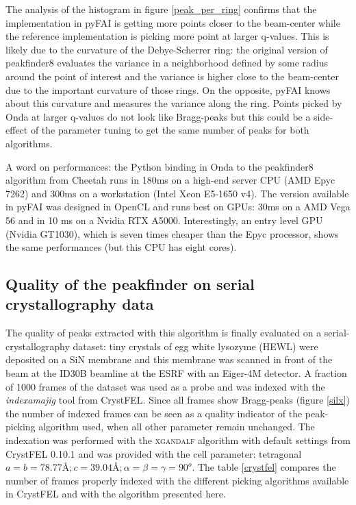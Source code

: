 \documentclass[preprint]{iucr}              %
\begin{document}
The analysis of the histogram in figure \ref{peak_per_ring} confirms that the implementation in pyFAI is getting more points closer to the beam-center while the reference implementation is picking more point at larger q-values.
This is likely due to the curvature of the Debye-Scherrer ring: the original version of peakfinder8 evaluates the variance in a neighborhood defined by some radius around the point of interest and the variance is higher close to the beam-center due to the important curvature of those rings.
On the opposite, pyFAI knows about this curvature and measures the variance along the ring.
Points picked by Onda at larger q-values do not look like Bragg-peaks but this could be a side-effect of the parameter tuning to get the same number of peaks for both algorithms.

A word on performances: the Python binding in Onda to the peakfinder8 algorithm from Cheetah runs in 180ms on a high-end server CPU (AMD Epyc 7262) and 300ms on a workstation (Intel Xeon E5-1650 v4). 
The version available in pyFAI was designed in OpenCL \cite{opencl_khronos, opencl, pyopencl} and runs best on GPUs: 30ms on a AMD Vega 56 and in 10 ms on a Nvidia RTX A5000. 
Interestingly, an entry level GPU (Nvidia GT1030), which is seven times cheaper than the Epyc processor, shows the same performances (but this CPU has eight cores). %

\subsection{Quality of the peakfinder on serial crystallography data}

The quality of peaks extracted with this algorithm is finally evaluated on a serial-crystallography dataset: tiny crystals of egg white lysozyme (HEWL) were deposited on a SiN membrane and this membrane was scanned in front of the beam at the ID30B beamline at the ESRF with an Eiger-4M detector.%
A fraction of 1000 frames of the dataset \cite{ssx-Lyso} was used as a probe and was indexed with the \textit{indexamajig} tool from CrystFEL. 
Since all frames show Bragg-peaks (figure \ref{silx}) the number of indexed frames can be seen as a quality indicator of the peak-picking algorithm used, when all other parameter remain unchanged.
The indexation was performed with the \textsc{xgandalf} algorithm \cite{xgandalf} with default settings from CrystFEL 0.10.1 and was provided with the cell parameter: tetragonal $a=b=78.77\text{\AA}; c=39.04\text{\AA}; \alpha=\beta=\gamma = 90^o$.
The table \ref{crystfel} compares the number of frames properly indexed with the different picking algorithms available in CrystFEL and with the algorithm presented here. 
\end{document}
